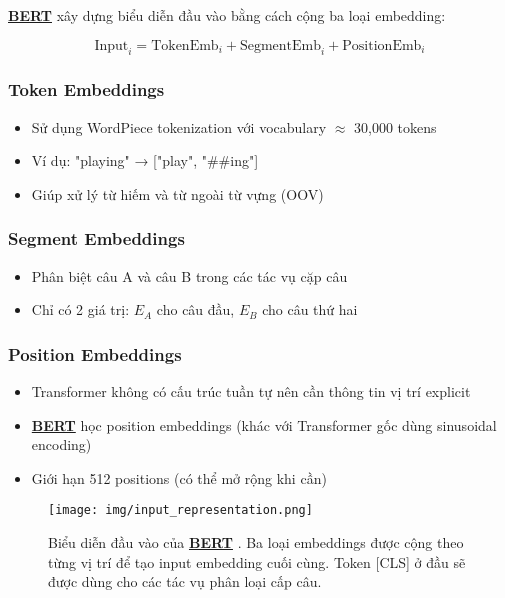     \hyperref[acro:bert]{\textbf{BERT}} xây dựng biểu diễn đầu vào bằng cách cộng ba loại embedding:
    
    \begin{equation}
    \text{Input}_i = \text{TokenEmb}_i + \text{SegmentEmb}_i + \text{PositionEmb}_i
    \label{eq:input_embedding}
    \end{equation}
    
    \subsubsection{Token Embeddings}
    \begin{itemize}
        \item Sử dụng WordPiece tokenization \cite{wu2016google} với vocabulary $\approx$ 30,000 tokens
        \item Ví dụ: "playing" → ["play", "\#\#ing"]
        \item Giúp xử lý từ hiếm và từ ngoài từ vựng (OOV)
    \end{itemize}
    
    \subsubsection{Segment Embeddings}  
    \begin{itemize}
        \item Phân biệt câu A và câu B trong các tác vụ cặp câu
        \item Chỉ có 2 giá trị: $E_A$ cho câu đầu, $E_B$ cho câu thứ hai
    \end{itemize}
    
    \subsubsection{Position Embeddings}
    \begin{itemize}
        \item Transformer không có cấu trúc tuần tự nên cần thông tin vị trí explicit
        \item \hyperref[acro:bert]{\textbf{BERT}} học position embeddings (khác với Transformer gốc dùng sinusoidal encoding)
        \item Giới hạn 512 positions (có thể mở rộng khi cần)
    \end{itemize}
    
    \begin{figure}[H]
        \centering
        \texttt{[image: img/input\_representation.png]}
        \caption{Biểu diễn đầu vào của \hyperref[acro:bert]{\textbf{BERT}} \cite{devlin2018bert}. Ba loại embeddings được cộng theo từng vị trí để tạo input embedding cuối cùng. Token [CLS] ở đầu sẽ được dùng cho các tác vụ phân loại cấp câu.}
        \label{fig:bert_input_representation}
    \end{figure}
    
